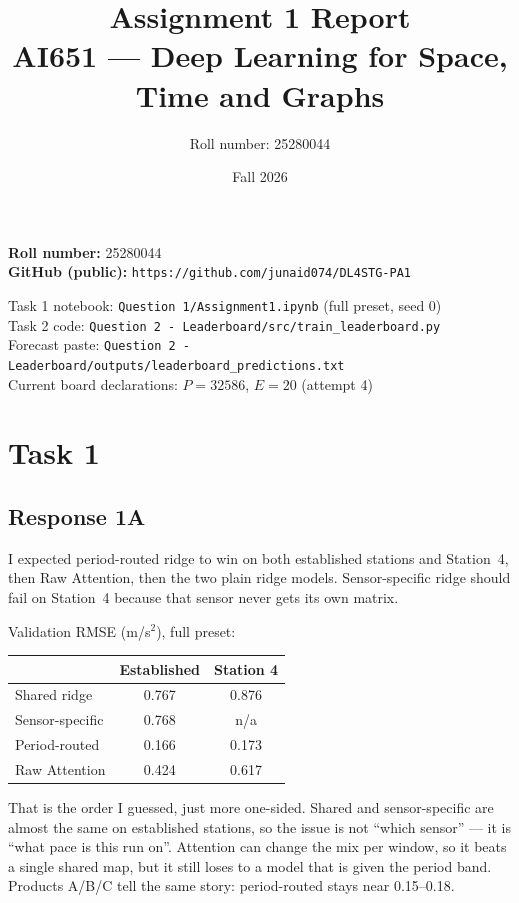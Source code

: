 \documentclass[11pt,a4paper]{article}
\title{Assignment 1 Report\\[0.2em]\large AI651 --- Deep Learning for Space, Time and Graphs}
\author{Roll number: 25280044}
\date{Fall 2026}
\begin{document}
\maketitle

\noindent
\textbf{Roll number:} 25280044\\
\textbf{GitHub (public):} \texttt{https://github.com/junaid074/DL4STG-PA1}

\vspace{0.3em}
\noindent
Task 1 notebook: \texttt{Question 1/Assignment1.ipynb} (full preset, seed 0)\\
Task 2 code: \texttt{Question 2 - Leaderboard/src/train\_leaderboard.py}\\
Forecast paste: \texttt{Question 2 - Leaderboard/outputs/leaderboard\_predictions.txt}\\
Current board declarations: $P{=}32586$, $E{=}20$ (attempt 4)

\section{Task 1}

\subsection{Response 1A}

I expected period-routed ridge to win on both established stations and Station~4, then Raw Attention, then the two plain ridge models. Sensor-specific ridge should fail on Station~4 because that sensor never gets its own matrix.

Validation RMSE (m/s$^2$), full preset:

\begin{center}
\begin{tabular}{lcc}
\toprule
 & Established & Station 4 \\
\midrule
Shared ridge & 0.767 & 0.876 \\
Sensor-specific & 0.768 & n/a \\
Period-routed & 0.166 & 0.173 \\
Raw Attention & 0.424 & 0.617 \\
\bottomrule
\end{tabular}
\end{center}

That is the order I guessed, just more one-sided. Shared and sensor-specific are almost the same on established stations, so the issue is not ``which sensor'' --- it is ``what pace is this run on''. Attention can change the mix per window, so it beats a single shared map, but it still loses to a model that is given the period band. Products A/B/C tell the same story: period-routed stays near 0.15--0.18.
\end{document}
